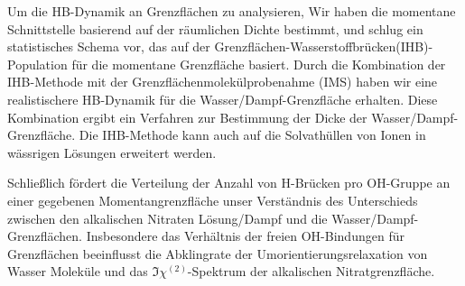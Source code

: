 \documentclass[
11pt, %
ngerman,
english, %
singlespacing, %
headsepline, %
]{MastersDoctoralThesis} %
\begin{document}
{\begin{extraAbstract}
Um die HB-Dynamik an Grenzflächen zu analysieren,
Wir haben die momentane Schnittstelle basierend auf der räumlichen Dichte bestimmt,
und schlug ein statistisches Schema vor, das auf der Grenzflächen-Wasserstoffbrücken(IHB)-Population für die momentane Grenzfläche basiert.
Durch die Kombination der IHB-Methode mit der Grenzflächenmolekülprobenahme (IMS) haben wir eine realistischere HB-Dynamik für die Wasser/Dampf-Grenzfläche erhalten.
Diese Kombination ergibt ein Verfahren zur Bestimmung der Dicke der Wasser/Dampf-Grenzfläche.
Die IHB-Methode kann auch auf die Solvathüllen von Ionen in wässrigen Lösungen erweitert werden.

Schließlich fördert die Verteilung der Anzahl von H-Brücken pro OH-Gruppe an einer gegebenen Momentangrenzfläche unser Verständnis des Unterschieds zwischen den alkalischen Nitraten
Lösung/Dampf und die Wasser/Dampf-Grenzflächen. Insbesondere das Verhältnis der freien OH-Bindungen für Grenzflächen beeinflusst die Abklingrate der Umorientierungsrelaxation von Wasser
Moleküle und das $\Im \chi^{(2)}$-Spektrum der alkalischen Nitratgrenzfläche.
\end{extraAbstract}
}
\end{document}
